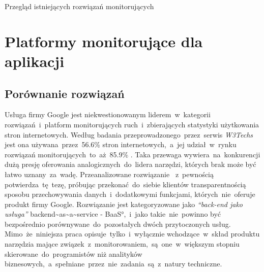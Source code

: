 \begin{chapter}{Przegląd istniejących rozwiązań monitorujących}
	\label{cha:existing_solutions}
	\newcommand{\chapterPath}{chapters/Existing_solutions}

	

	\section{Platformy monitorujące dla aplikacji} 
	
	
	
	
	\subsection{Porównanie rozwiązań}
	Usługa firmy Google jest niekwestionowanym liderem~w~kategorii rozwiązań~i~platform monitorujących ruch~i~zbierających statystyki użytkowania stron internetowych. Według badania przeprowadzonego~przez~serwis {\it W3Techs} jest ona używana~przez~56.6\% stron internetowych,~a~jej udział~w~rynku rozwiązań monitorujących~to~aż~85.9\% \cite{Analytics_Stats}. Taka przewaga wywiera~na~konkurencji dużą presję oferowania analogicznych~do~lidera narzędzi, których brak może być łatwo uznany~za~wadę. Przeanalizowane rozwiązanie ~z~pewnością potwierdza~tę~tezę, próbując przekonać~do~siebie klientów transparentnością sposobu przechowywania danych~i~dodatkowymi funkcjami, których~nie~oferuje produkt firmy Google. Rozwiązanie  jest kategoryzowane jako {\it ``back-end jako usługa''} \ang{backend~as~a~service - BaaS},~i~jako takie~nie~powinno być bezpośrednio porównywane~do~pozostałych dwóch przytoczonych usług. Mimo~że~niniejsza praca opisuje~tylko~i~wyłącznie wchodzące~w~skład produktu  narzędzia mające związek~z~monitorowaniem,~są~one~w~większym stopniu skierowane~do~programistów niż analityków biznesowych,~a~spełniane~przez~nie~zadania~są~z~natury techniczne.
	
	
	

\end{chapter}
